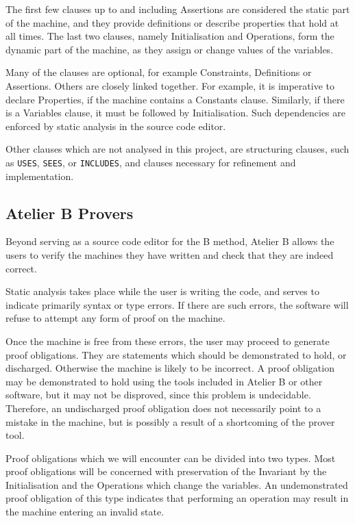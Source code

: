 \documentclass[12pt,journal,duplex]{IEEEtran}
\begin{document}
	The first few clauses up to and including Assertions are considered the static part of the machine, and they provide definitions or describe properties that hold at all times. The last two clauses, namely Initialisation and Operations, form the dynamic part of the machine, as they assign or change values of the variables.

	Many of the clauses are optional, for example Constraints, Definitions or Assertions. Others are closely linked together. For example, it is imperative to declare Properties, if the machine contains a Constants clause. Similarly, if there is a Variables clause, it must be followed by Initialisation. Such dependencies are enforced by static analysis in the source code editor.

	Other clauses which are not analysed in this project, are structuring clauses, such as \texttt{USES}, \texttt{SEES}, or \texttt{INCLUDES}, and clauses necessary for refinement and implementation.

	\subsection{Atelier B Provers}
	Beyond serving as a source code editor for the B method, Atelier B allows the users to verify the machines they have written and check that they are indeed correct. 

	Static analysis takes place while the user is writing the code, and serves to indicate primarily syntax or type errors. If there are such errors, the software will refuse to attempt any form of proof on the machine.


	Once the machine is free from these errors, the user may proceed to generate proof obligations. They are statements which should be demonstrated to hold, or discharged. Otherwise the machine is likely to be incorrect. A proof obligation may be demonstrated to hold using the tools included in Atelier B or other software, but it may not be disproved, since this problem is undecidable\cite{sipser}. Therefore, an undischarged proof obligation does not necessarily point to a mistake in the machine, but is possibly a result of a shortcoming of the prover tool.

	Proof obligations which we will encounter can be divided into two types. Most proof obligations will be concerned with preservation of the Invariant by the Initialisation and the Operations which change the variables. An undemonstrated proof obligation of this type indicates that performing an operation may result in the machine entering an invalid state.
\end{document}
